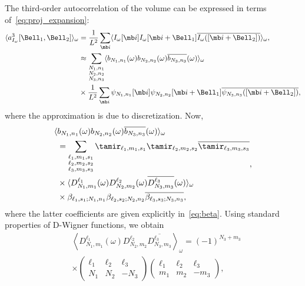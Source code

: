 \documentclass[9pt,twocolumn,twoside,lineno]{pnas-new}
\begin{document}
The third-order autocorrelation of the volume can be expressed in terms of~\eqref{eq:proj_expansion}:
\begin{align} \label{eq:third_order_ac_volume}
\langle
a^3_{I_{\omega}}[\Bell_1, \Bell_2]\rangle_{\omega} &= \frac{1}{L^2}\sum_{\mb i}\langle I_{\omega}[\mb i]I_{\omega}[\mb i+\Bell_1]\overline{I_{\omega}([\mb i+\Bell_2])}\rangle_{\omega},\\
&\approx \sum_{\substack{N_1,n_1\\N_2,n_2\\N_3,n_3}} \langle b_{N_1,n_1}(\omega)b_{N_2,n_2}(\omega)\overline{b_{N_3,n_3}}(\omega)\rangle_{\omega}\\&\times \frac{1}{L^2}\sum_{\mb i}\psi_{N_1,n_1}[\mb i]\psi_{N_2,n_2}[\mb i+\Bell_1]\overline{\psi_{N_3,n_3}([\mb i+\Bell_2])},\nonumber\end{align}
where the approximation is due to discretization. 
Now,
\[\begin{aligned} \langle &b_{N_1,n_1}(\omega)b_{N_2,n_2}(\omega)\overline{b_{N_3,n_3}}(\omega)\rangle_{\omega} \\&= \sum_{\substack{\ell_1,m_1,s_1\\\ell_2,m_2,s_2\\\ell_3,m_3,s_3}}\tamir_{\ell_1,m_1,s_1}\tamir_{\ell_2,m_2,s_2}\overline{\tamir_{\ell_3,m_3,s_3}}\\&\times \langle D_{N_1,m_1}^{\ell_1}(\omega)D_{N_2,m_2}^{\ell_2}(\omega)\overline{D_{N_3,m_3}^{\ell_3}}(\omega)\rangle_{\omega}\\
&\times \beta_{\ell_1,s_1;N_1,n_1}\beta_{\ell_2,s_2;N_2,n_2}\overline{\beta_{\ell_3,s_3;N_3,n_3}},\end{aligned},\]
where the latter coefficients are given explicitly in~\eqref{eq:beta}. Using standard properties of D-Wigner functions, we obtain  
\begin{align}
&\left\langle D_{N_1,m_1}^{\ell_1}(\omega)D_{N_2,m_2}^{\ell_2}\overline{D_{N_3,m_3}^{\ell_3}}\right\rangle_{\omega} = (-1)^{N_3+m_3}\\&\times \left(\begin{array}{ccc}\ell_1 & \ell_2  & \ell_3\\ N_1 & N_2 & -N_3\end{array}\right)\left(\begin{array}{ccc}\ell_1 & \ell_2  & \ell_3\\ m_1 & m_2 & -m_3\end{array}\right),\
\end{align}
\end{document}
